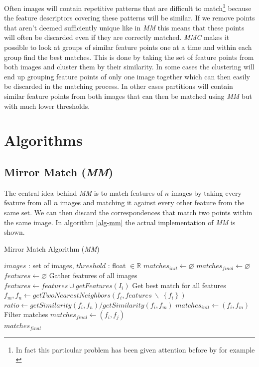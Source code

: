 \documentclass{article}
\begin{document}
Often images will contain repetitive patterns that are difficult to 
match\footnote{In fact this particular problem has been given attention 
before by for example \cite{fan2011towards}} because the feature 
descriptors covering these patterns will be similar. If we remove points 
that aren't deemed sufficiently unique like in \emph{MM} this means that 
these points will often be discarded even if they are correctly matched.
\emph{MMC} makes it possible to look at groups of similar feature points 
one at a time and within each group find the best matches. This is done 
by taking the set of feature points from both images and cluster them by 
their similarity. In some cases the clustering will end up grouping 
feature points of only one image together which can then easily be 
discarded in the matching process.  In other cases partitions will 
contain similar feature points from both images that can then be matched 
using \emph{MM} but with much lower thresholds.

\section{Algorithms}
\label{algorithms}

\subsection{Mirror Match (\emph{MM})}

The central idea behind \emph{MM} is to match features of $n$ images by 
taking every feature from all $n$ images and matching it against every 
other feature from the same set. We can then discard the correspondences 
that match two points within the same image. In algorithm \ref{alg-mm} 
the actual implementation of \emph{MM} is shown.

\begin{algorithm}
\caption{Mirror Match Algorithm (\emph{MM})}
\label{alg-mm}
\begin{algorithmic}
\Require $images$ : set of images, $threshold$ : float $\in \mathbb{R}$
\State $matches_{init}\gets \varnothing$
\State $matches_{final}\gets \varnothing$
\State $features\gets \varnothing$
 \Comment Gather features of all images
	\State $features\gets features \cup getFeatures(I_i)$
\EndFor
{} \Comment Get best match for all features
	\State $f_m,f_n \gets getTwoNearestNeighbors(f_i, features ~ 
\backslash ~ \left\{f_i\right\})$
	\State $ratio \gets getSimilarity(f_i, f_n) / getSimilarity(f_i, 
f_m)$
		\State $matches_{init} \gets \left(f_i, f_m\right)$
	\EndIf
\EndFor
{} \Comment Filter 
matches
		\State $matches_{final} \gets (f_i, f_j)$
	\EndIf
\EndFor \\
\Return $matches_{final}$
\end{algorithmic}
\end{algorithm}
\end{document}
